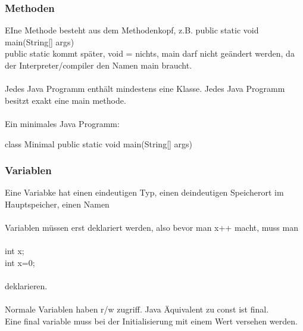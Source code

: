 \documentclass[11pt, a4paper]{article}
\begin{document}
\subsubsection{Methoden}
EIne Methode besteht aus dem Methodenkopf, z.B. public static void main(String[] args){}\\public static kommt später, void = nichts, main darf nicht geändert werden, da der Interpreter/compiler den Namen main braucht.\\\\Jedes Java Programm enthält mindestens eine Klasse. Jedes Java Programm besitzt exakt eine main methode.\\\\Ein minimales Java Programm:\\
\hspace*{0cm}\hfill
\begin{minipage}[l]{.8\linewidth}
\begin{code}
class Minimal{
	public static void main(String[] args){
	}
}
\end{code}
\end{minipage}

\subsubsection{Variablen}
Eine Variabke hat einen eindeutigen Typ, einen deindeutigen Speicherort im Hauptspeicher, einen Namen\\\\Variablen müssen erst deklariert werden, also bevor man x++ macht, muss man\\\\ int x;\\int x=0;\\\\deklarieren.\\\\ Normale Variablen haben r/w zugriff. Java Äquivalent zu const ist final.\\Eine final variable muss bei der Initialisierung mit einem Wert versehen werden.
\end{document}
